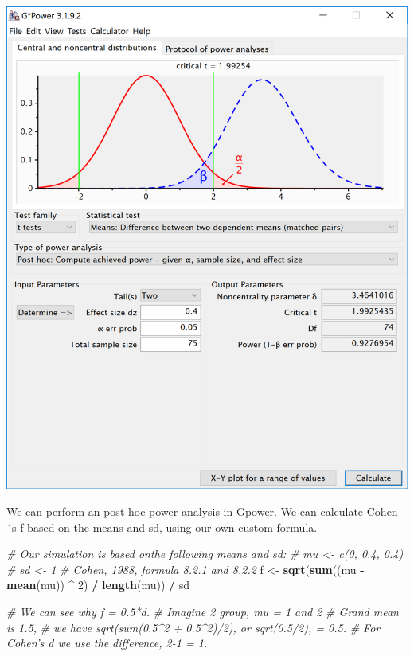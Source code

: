 \documentclass[
]{book}
\newenvironment{Shaded}{\begin{snugshade}}{\end{snugshade}}
\newcommand{\CommentTok}[1]{\textcolor[rgb]{0.56,0.35,0.01}{\textit{#1}}}
\newcommand{\DecValTok}[1]{\textcolor[rgb]{0.00,0.00,0.81}{#1}}
\newcommand{\KeywordTok}[1]{\textcolor[rgb]{0.13,0.29,0.53}{\textbf{#1}}}
\newcommand{\NormalTok}[1]{#1}
\newcommand{\OperatorTok}[1]{\textcolor[rgb]{0.81,0.36,0.00}{\textbf{#1}}}
\newcommand{\StringTok}[1]{\textcolor[rgb]{0.31,0.60,0.02}{#1}}
\begin{document}
\includegraphics{screenshots/gpower_2.png}

We can perform an post-hoc power analysis in Gpower. We can calculate Cohen´s f based on the means and sd, using our own custom formula.

\begin{Shaded}
\begin{Highlighting}[]
\CommentTok{# Our simulation is based onthe following means and sd:}
\CommentTok{# mu <- c(0, 0.4, 0.4)}
\CommentTok{# sd <- 1}
\CommentTok{# Cohen, 1988, formula 8.2.1 and 8.2.2}
\NormalTok{f <-}\StringTok{ }\KeywordTok{sqrt}\NormalTok{(}\KeywordTok{sum}\NormalTok{((mu }\OperatorTok{-}\StringTok{ }\KeywordTok{mean}\NormalTok{(mu)) }\OperatorTok{^}\StringTok{ }\DecValTok{2}\NormalTok{) }\OperatorTok{/}\StringTok{ }\KeywordTok{length}\NormalTok{(mu)) }\OperatorTok{/}\StringTok{ }\NormalTok{sd }

\CommentTok{# We can see why f = 0.5*d.}
\CommentTok{# Imagine 2 group, mu = 1 and 2}
\CommentTok{# Grand mean is 1.5, }
\CommentTok{# we have sqrt(sum(0.5^2 + 0.5^2)/2), or sqrt(0.5/2), = 0.5.}
\CommentTok{# For Cohen's d we use the difference, 2-1 = 1. }
\end{Highlighting}
\end{Shaded}
\end{document}
